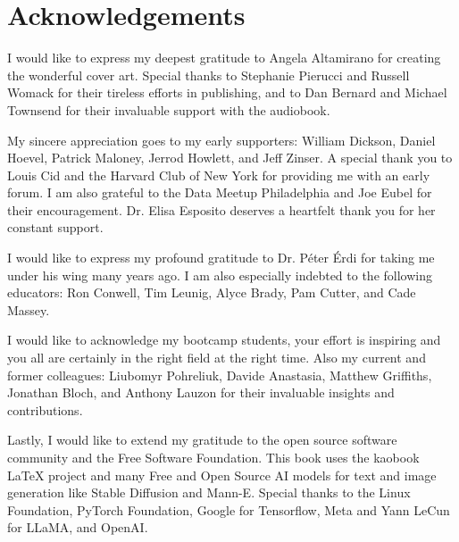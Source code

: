 \let\cleardoublepage\clearpage
\chapter*{Acknowledgements}

I would like to express my deepest gratitude to Angela Altamirano for creating the wonderful cover art. Special thanks to Stephanie Pierucci and Russell Womack for their tireless efforts in publishing, and to Dan Bernard and Michael Townsend for their invaluable support with the audiobook.

My sincere appreciation goes to my early supporters: William Dickson, Daniel Hoevel, Patrick Maloney, Jerrod Howlett, and Jeff Zinser. A special thank you to Louis Cid and the Harvard Club of New York for providing me with an early forum. I am also grateful to the Data Meetup Philadelphia and Joe Eubel for their encouragement. Dr. Elisa Esposito deserves a heartfelt thank you for her constant support.

I would like to express my profound gratitude to Dr. Péter Érdi for taking me under his wing many years ago. I am also especially indebted to the following educators: Ron Conwell, Tim Leunig, Alyce Brady, Pam Cutter, and Cade Massey.

I would like to acknowledge my bootcamp students, your effort is inspiring and you all are certainly in the right field at the right time. Also my current and former colleagues: Liubomyr Pohreliuk, Davide Anastasia, Matthew Griffiths, Jonathan Bloch, and Anthony Lauzon for their invaluable insights and contributions.

Lastly, I would like to extend my gratitude to the open source software community and the Free Software Foundation. This book uses the kaobook LaTeX project and many Free and Open Source AI models for text and image generation like Stable Diffusion and Mann-E. Special thanks to the Linux Foundation, PyTorch Foundation, Google for Tensorflow, Meta and Yann LeCun for LLaMA, and OpenAI.
